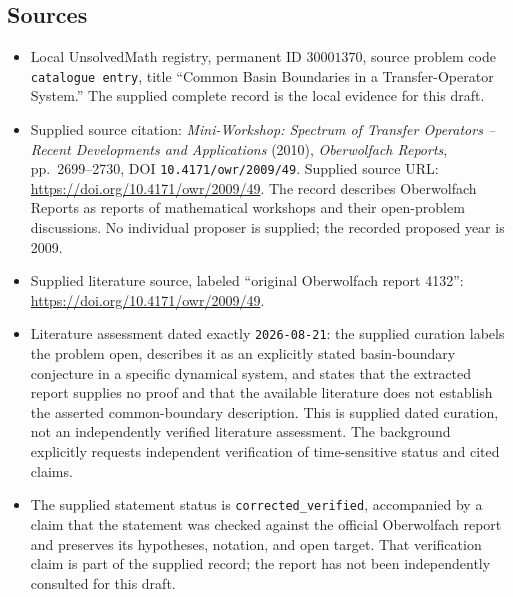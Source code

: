 \documentclass[11pt]{article}
\begin{document}
\subsection{Sources}
\begin{itemize}
\item Local UnsolvedMath registry, permanent ID \(30001370\), source problem code \texttt{catalogue entry}, title ``Common Basin Boundaries in a Transfer-Operator System.'' The supplied complete record is the local evidence for this draft.
\item Supplied source citation: \emph{Mini-Workshop: Spectrum of Transfer Operators -- Recent Developments and Applications} (2010), \emph{Oberwolfach Reports}, pp.\ 2699--2730, DOI \texttt{10.4171/owr/2009/49}. Supplied source URL: \url{https://doi.org/10.4171/owr/2009/49}. The record describes Oberwolfach Reports as reports of mathematical workshops and their open-problem discussions. No individual proposer is supplied; the recorded proposed year is 2009.
\item Supplied literature source, labeled ``original Oberwolfach report 4132'': \url{https://doi.org/10.4171/owr/2009/49}.
\item Literature assessment dated exactly \texttt{2026-08-21}: the supplied curation labels the problem open, describes it as an explicitly stated basin-boundary conjecture in a specific dynamical system, and states that the extracted report supplies no proof and that the available literature does not establish the asserted common-boundary description. This is supplied dated curation, not an independently verified literature assessment. The background explicitly requests independent verification of time-sensitive status and cited claims.
\item The supplied statement status is \texttt{corrected\_verified}, accompanied by a claim that the statement was checked against the official Oberwolfach report and preserves its hypotheses, notation, and open target. That verification claim is part of the supplied record; the report has not been independently consulted for this draft.
\end{itemize}
\end{document}
